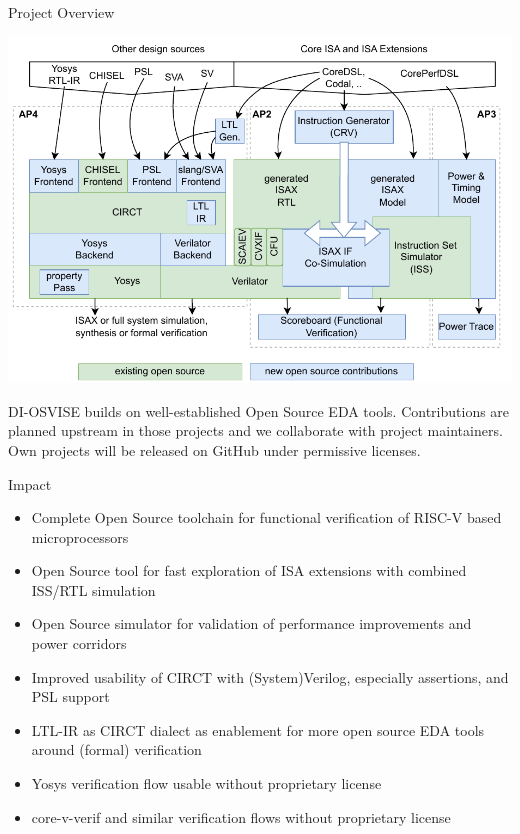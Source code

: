 \documentclass[portrait,a0]{a0poster}
\newcommand{\mainbox}[3]{
    \begin{mdframed}[style=mainbox]
        \begin{center}
            \vspace{5mm}
            {\extrabold \Huge #1}
        \end{center}
        \vspace{5mm}
        \parbox[t][#2][t]{\linewidth}{\large
            #3
        }
    \end{mdframed}
}
\begin{document}
\noindent\begin{minipage}[t]{\textwidth}
    \mainbox{Project Overview}{30cm}{
    \begin{minipage}{40cm}
        \includegraphics[width=40cm]{overview.drawio}
    \end{minipage}
    \hfill
    \begin{minipage}{30cm}
        DI-OSVISE builds on well-established Open Source EDA tools. Contributions are planned upstream in those projects and we collaborate with project maintainers. Own projects will be released on GitHub under permissive licenses.

        \bigskip

        \begin{mdframed}[style=highlightbox]
            {\extrabold \Large Impact}
            \begin{itemize}
                \item Complete Open Source toolchain for functional verification of RISC-V based microprocessors
                \item Open Source tool for fast exploration of ISA extensions with combined ISS/RTL simulation
                \item Open Source simulator for validation of performance improvements and power corridors
                \item Improved usability of CIRCT with (System)Verilog, especially assertions, and PSL support
                \item LTL-IR as CIRCT dialect as enablement for more open source EDA tools around (formal) verification
                \item Yosys verification flow usable without proprietary license
                \item core-v-verif and similar verification flows without proprietary license
            \end{itemize}
        \end{mdframed}

        \end{minipage}
    }
\end{minipage}
\end{document}
